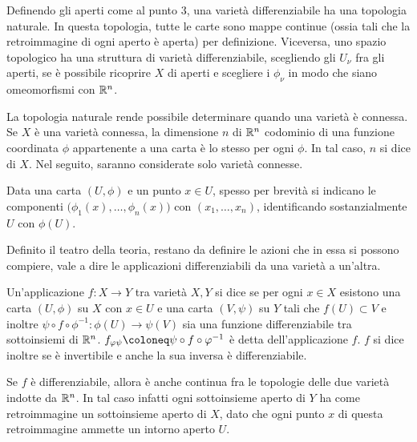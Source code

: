 \begin{remark}
  Definendo gli aperti come al punto $3$, una varietà differenziabile ha una topologia naturale. In questa topologia, tutte le carte sono mappe continue (ossia tali che la retroimmagine di ogni aperto è aperta) per definizione. Viceversa, uno spazio topologico ha una struttura di varietà differenziabile, scegliendo gli $U_{\nu}$ fra gli aperti, se è possibile ricoprire $X$ di aperti e scegliere i $\phi_{\nu}$ in modo che siano omeomorfismi con $\mathbb{R}^{n}$.
\end{remark}
\begin{remark}
  La topologia naturale rende possibile determinare quando una varietà è connessa. Se $X$ è una varietà connessa, la dimensione $n$ di $\mathbb{R}^{n}$ codominio di una funzione coordinata $\phi$ appartenente a una carta è lo stesso per ogni $\phi$. In tal caso, $n$ si dice  di $X$. Nel seguito, saranno considerate solo varietà connesse.
\end{remark} 

Data una carta $(U,\phi)$ e un punto $x \in U$, spesso per brevità si indicano le componenti $\big(\phi_1(x), \ldots, \phi_{n}(x)\big)$ con $(x_1, \ldots, x_n)$, identificando sostanzialmente $U$ con $\phi(U)$. 

Definito il teatro della teoria, restano da definire le azioni che in essa si possono compiere, vale a dire le applicazioni differenziabili da una varietà a un'altra.
\begin{definition}
  Un'applicazione $f:X \to Y$ tra varietà $X, Y$ si dice  se per ogni $x \in  X$ esistono una carta $(U, \phi)$ su $X$ con $x \in U$ e una carta $(V, \psi)$ su $Y$ tali che $f(U) \subset V$ e inoltre $\psi \circ f \circ \phi^{-1}: \phi(U) \to \psi(V)$ sia una funzione differenziabile tra sottoinsiemi di $\mathbb{R}^{n}$. $f_{\phi \psi} \defeq \psi \circ f \circ \phi^{-1}$ è detta  dell'applicazione $f$. $f$ si dice inoltre  se è invertibile e anche la sua inversa è differenziabile. 
\end{definition}
\begin{remark}
  Se $f$ è differenziabile, allora è anche continua fra le topologie delle due varietà indotte da $\mathbb{R}^{n}$. In tal caso infatti ogni sottoinsieme aperto di $Y$ ha come retroimmagine un sottoinsieme aperto di $X$, dato che ogni punto $x$ di questa retroimmagine ammette un intorno aperto $U$.
\end{remark}

